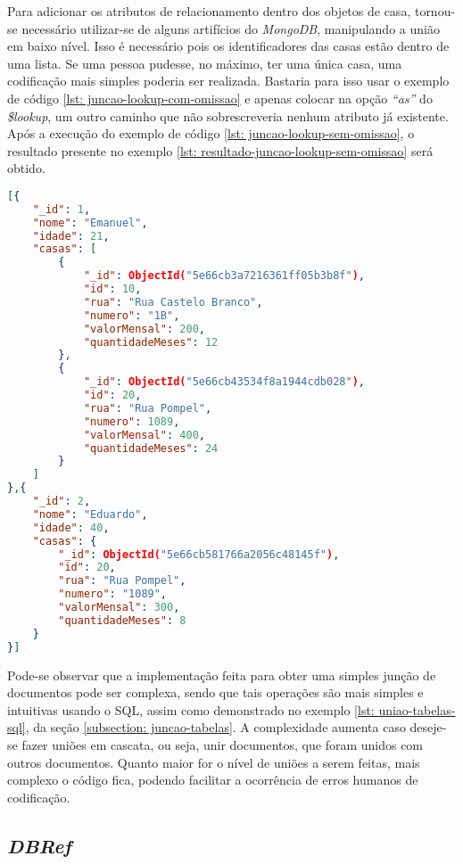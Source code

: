 Para adicionar os atributos de relacionamento dentro dos objetos de casa, tornou-se necessário utilizar-se de alguns artifícios do \textit{MongoDB}, manipulando a união em baixo nível. Isso é necessário pois os identificadores das casas estão dentro de uma lista. Se uma pessoa pudesse, no máximo, ter uma única casa, uma codificação mais simples poderia ser realizada. Bastaria para isso usar o exemplo de código \ref{lst: juncao-lookup-com-omissao} e apenas colocar na opção \textit{``as''} do \textit{\$lookup}, um outro caminho que não sobrescreveria nenhum atributo já existente. Após a execução do exemplo de código \ref{lst: juncao-lookup-sem-omissao}, o resultado presente no exemplo \ref{lst: resultado-juncao-lookup-sem-omissao} será obtido.


\begin{lstlisting}[language=json, caption={Resultado da Junção de Documentos sem Omissão\label{lst: resultado-juncao-lookup-sem-omissao}}]
[{
    "_id": 1,
    "nome": "Emanuel",
    "idade": 21,
    "casas": [
        {
            "_id": ObjectId("5e66cb3a7216361ff05b3b8f"),
            "id": 10,
            "rua": "Rua Castelo Branco",
            "numero": "1B",
            "valorMensal": 200,
            "quantidadeMeses": 12
        },
        {
            "_id": ObjectId("5e66cb43534f8a1944cdb028"),
            "id": 20,
            "rua": "Rua Pompel",
            "numero": 1089,
            "valorMensal": 400,
            "quantidadeMeses": 24
        }
    ]
},{
    "_id": 2,
    "nome": "Eduardo",
    "idade": 40,
    "casas": {
        "_id": ObjectId("5e66cb581766a2056c48145f"),
        "id": 20,
        "rua": "Rua Pompel",
        "numero": "1089",
        "valorMensal": 300,
        "quantidadeMeses": 8
    }
}]
\end{lstlisting}

Pode-se observar que a implementação feita para obter uma simples junção de documentos pode ser complexa, sendo que tais operações são mais simples e intuitivas usando o SQL, assim como demonstrado no exemplo \ref{lst: uniao-tabelas-sql}, da seção \ref{subsection: juncao-tabelas}. A complexidade aumenta caso deseje-se fazer uniões em cascata, ou seja, unir documentos, que foram unidos com outros documentos. Quanto maior for o nível de uniões a serem feitas, mais complexo o código fica, podendo facilitar a ocorrência de erros humanos de codificação.

\subsection{\textit{DBRef}}

